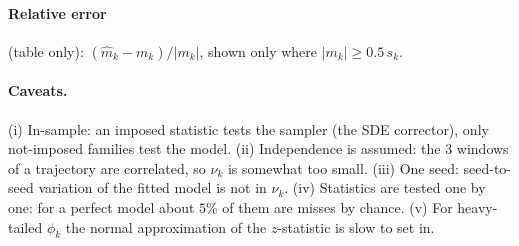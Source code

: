 \documentclass[11pt]{article}
\begin{document}
\paragraph{Relative error} (table only): $(\hat m_k-m_k)/|m_k|$, shown only where $|m_k|\ge0.5\,s_k$.

\paragraph{Caveats.}
(i) In-sample: an imposed statistic tests the sampler (the SDE corrector), only not-imposed families test the
model. (ii) Independence is assumed: the 3 windows of a trajectory are correlated, so $\nu_k$ is somewhat too small.
(iii) One seed: seed-to-seed variation of the fitted model is not in $\nu_k$. (iv) Statistics are tested one by
one: for a perfect model about $5\%$ of them are misses by chance. (v) For heavy-tailed $\phi_k$ the normal
approximation of the $z$-statistic is slow to set in.
\end{document}
